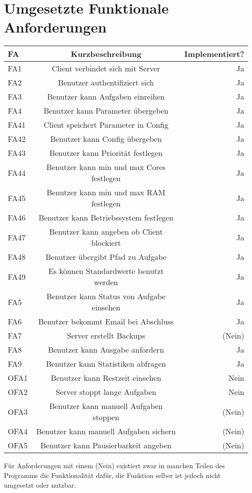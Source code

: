 \documentclass[a4paper,12pt]{article}
\begin{document}
\section{Umgesetzte Funktionale Anforderungen}

\begin{tabular}{|l|c|r|}
	\hline
	FA & Kurzbeschreibung & Implementiert? \\ \hline \hline
	FA1 & Client verbindet sich mit Server & Ja \\ \hline
	FA2 & Benutzer authentifiziert sich & Ja \\ \hline
	FA3 & Benutzer kann Aufgaben einreihen & Ja \\ \hline
	FA4 & Benutzer kann Parameter übergeben & Ja \\ \hline
	FA41 & Client speichert Parameter in Config & Ja \\ \hline
	FA42 & Benutzer kann Config übergeben & Ja \\ \hline
	FA43 & Benutzer kann Priorität festlegen & Ja \\ \hline
	FA44 & Benutzer kann min und max Cores festlegen & Ja \\ \hline
	FA45 & Benutzer kann min und max RAM festlegen & Ja \\ \hline
	FA46 & Benutzer kann Betriebssystem festlegen & Ja \\ \hline
	FA47 & Benutzer kann angeben ob Client blockiert & Ja \\ \hline
	FA48 & Benutzer übergibt Pfad zu Aufgabe & Ja \\ \hline
	FA49 & Es können Standardwerte benutzt werden & Ja \\ \hline
	FA5 & Benutzer kann Status von Aufgabe einsehen & Ja \\ \hline
	FA6 & Benutzer bekommt Email bei Abschluss & Ja \\ \hline
	FA7 & Server erstellt Backups & (Nein) \\ \hline
	FA8 & Benutzer kann Ausgabe anfordern & Ja \\ \hline
	FA9 & Benutzer kann Statistiken abfragen & Ja \\ \hline \hline
	OFA1 & Benutzer kann Restzeit einsehen & Nein \\ \hline
	OFA2 & Server stoppt lange Aufgaben & Nein \\ \hline
	OFA3 & Benutzer kann manuell Aufgaben stoppen & (Nein) \\ \hline
	OFA4 & Benutzer kann manuell Aufgaben sichern & (Nein) \\ \hline
	OFA5 & Benutzer kann Pausierbarkeit angeben & (Nein) \\ \hline
\end{tabular}
\newline \newline
Für Anforderungen mit einem (Nein) existiert zwar in manchen Teilen des Programms die Funktionalität dafür, die Funktion selber ist jedoch nicht umgesetzt oder nutzbar.
\end{document}
